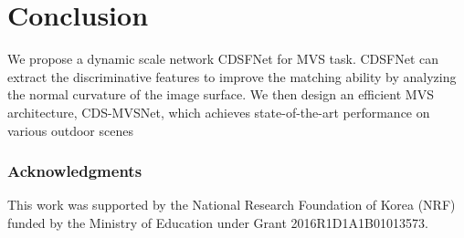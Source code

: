 \documentclass{article} \usepackage{iclr2022_conference,times}
\begin{document}
\section{Conclusion}
\vspace{-0.25cm}
We propose a dynamic scale network CDSFNet for MVS task.  CDSFNet can extract the discriminative features to improve the matching ability by analyzing the normal curvature of the image surface. We then design an efficient MVS architecture, CDS-MVSNet, which achieves state-of-the-art performance on various outdoor scenes 









































































\subsubsection*{Acknowledgments}
This work was supported by the National Research Foundation of Korea (NRF) funded by the Ministry of Education under Grant 2016R1D1A1B01013573.




\end{document}
